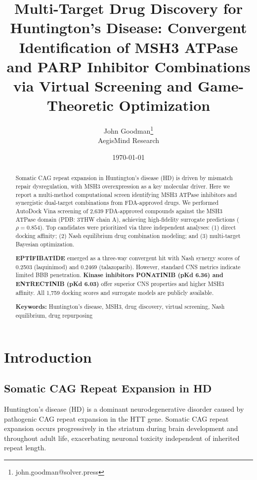\documentclass[12pt,a4paper]{article}
\title{\Large\textbf{Multi-Target Drug Discovery for Huntington's Disease: Convergent Identification of MSH3 ATPase and PARP Inhibitor Combinations via Virtual Screening and Game-Theoretic Optimization}}
\author{John Goodman\thanks{john.goodman@solver.press} \\ AegisMind Research}
\date{\today}
\begin{document}
\maketitle

\begin{abstract}
Somatic CAG repeat expansion in Huntington's disease (HD) is driven by mismatch repair dysregulation, with MSH3 overexpression as a key molecular driver. Here we report a multi-method computational screen identifying MSH3 ATPase inhibitors and synergistic dual-target combinations from FDA-approved drugs. We performed AutoDock Vina screening of 2,639 FDA-approved compounds against the MSH3 ATPase domain (PDB: 3THW chain A), achieving high-fidelity surrogate predictions ($\rho = 0.854$). Top candidates were prioritized via three independent analyses: (1) direct docking affinity; (2) Nash equilibrium drug combination modeling; and (3) multi-target Bayesian optimization.

\textbf{EPTIFIBATIDE} emerged as a three-way convergent hit with Nash synergy scores of 0.2503 (laquinimod) and 0.2469 (talazoparib). However, standard CNS metrics indicate limited BBB penetration. \textbf{Kinase inhibitors PONATINIB (pKd 6.36) and ENTRECTINIB (pKd 6.03)} offer superior CNS properties and higher MSH3 affinity. All 1,759 docking scores and surrogate models are publicly available.

\textbf{Keywords:} Huntington's disease, MSH3, drug discovery, virtual screening, Nash equilibrium, drug repurposing

\end{abstract}

\tableofcontents

\newpage

\section{Introduction}

\subsection{Somatic CAG Repeat Expansion in HD}

Huntington's disease (HD) is a dominant neurodegenerative disorder caused by pathogenic CAG repeat expansion in the HTT gene. Somatic CAG repeat expansion occurs progressively in the striatum during brain development and throughout adult life, exacerbating neuronal toxicity independent of inherited repeat length.
\end{document}
